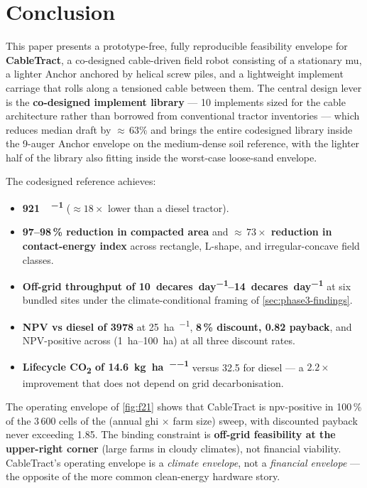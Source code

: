 \documentclass[11pt,a4paper]{article}
\begin{document}
\section{Conclusion}\label{sec:conclusion}

This paper presents a prototype-free, fully reproducible feasibility envelope for \textbf{CableTract}, a co-designed cable-driven field robot consisting of a stationary \gls{mu}, a lighter Anchor anchored by helical screw piles, and a lightweight implement carriage that rolls along a tensioned cable between them. The central design lever is the \textbf{co-designed implement library} --- 10 implements sized for the cable architecture rather than borrowed from conventional tractor inventories --- which reduces median draft by ${\approx}\,63\%$ and brings the entire codesigned library inside the 9-auger Anchor envelope on the medium-dense soil reference, with the lighter half of the library also fitting inside the worst-case loose-sand envelope.

The codesigned reference achieves:

\begin{itemize}[leftmargin=1.6em,itemsep=0.15em]
    \item \textbf{\SI{921}{\Wh\per\decare}} (${\approx}18\times$ lower than a diesel tractor).
    \item \textbf{97--98\,\% reduction in compacted area} and \textbf{${\approx}\,73\times$ reduction in contact-energy index} across rectangle, L-shape, and irregular-concave field classes.
    \item \textbf{Off-grid throughput of \SIrange{10}{14}{decares\per day}} at six bundled sites under the climate-conditional framing of \cref{sec:phase3-findings}.
    \item \textbf{NPV vs diesel of \SI{+3978}{\EUR}} at \SI{25}{\hectare\per\year}, \textbf{8\,\% discount, \SI{0.82}{\year} payback}, and NPV-positive across (\SIrange{1}{100}{\hectare}) at all three discount rates.
    \item \textbf{Lifecycle CO\textsubscript{2} of \SI{14.6}{\kilogram\per\hectare\per\year}} versus 32.5 for diesel --- a $2.2\times$ improvement that does not depend on grid decarbonisation.
\end{itemize}

The operating envelope of \cref{fig:f21} shows that CableTract is \gls{npv}-positive in 100\,\% of the 3\,600 cells of the (annual \gls{ghi} $\times$ farm size) sweep, with discounted payback never exceeding \SI{1.85}{\year}. The binding constraint is \textbf{off-grid feasibility at the upper-right corner} (large farms in cloudy climates), not financial viability. CableTract's operating envelope is a \emph{climate envelope}, not a \emph{financial envelope} --- the opposite of the more common clean-energy hardware story.
\end{document}
